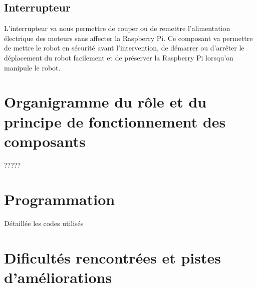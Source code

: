 \subsection{Interrupteur}
L'interrupteur va nous permettre de couper ou de remettre l'alimentation électrique des moteurs sans affecter la Raspberry Pi. Ce composant va permettre de mettre le robot en sécurité avant l'intervention, de démarrer ou d'arrêter le déplacement du robot facilement et de préserver la Raspberry Pi lorsqu'on manipule le robot.



\section{Organigramme du rôle et du principe de fonctionnement des composants}
?????

\section{Programmation}
Détaillée les codes utilisés

\section{Dificultés rencontrées et pistes d'améliorations}

